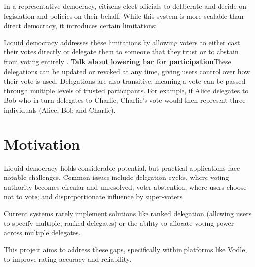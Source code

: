 In a representative democracy, citizens elect officials to deliberate and decide on legislation and policies on their behalf. While this system is more scalable than direct democracy, it introduces certain limitations:

Liquid democracy addresses these limitations by allowing voters to either cast their votes directly or delegate them to someone that they trust or to abstain from voting entirely \citep{blum_liquid_2016}. \textbf{Talk about lowering bar for participation}These delegations can be updated or revoked at any time, giving users control over how their vote is used. Delegations are also transitive, meaning a vote can be passed through multiple levels of trusted participants. For example, if Alice delegates to Bob who in turn delegates to Charlie, Charlie's vote would then represent three individuals (Alice, Bob and Charlie).



\section{Motivation}
Liquid democracy holds considerable potential, but practical applications face notable challenges. Common issues include delegation cycles, where voting authority becomes circular and unresolved; voter abstention, where users choose not to vote; and disproportionate influence by super-voters.

Current systems rarely implement solutions like ranked delegation (allowing users to specify multiple, ranked delegates) or the ability to allocate voting power across multiple delegates.

This project aims to address these gaps, specifically within platforms like Vodle, to improve rating accuracy and reliability.

